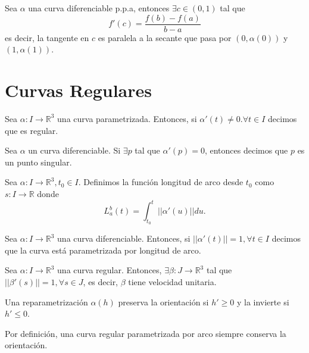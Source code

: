 \begin{theo}
  Sea $\alpha$ una curva diferenciable p.p.a, entonces $\exists c \in ( 0,1 )$ tal que 
  \[ 
    f'(c) = \frac{f(b) - f(a)}{b - a} 
  \] 
  es decir, la tangente en $c$ es paralela a la secante que pasa por $(0, \alpha(0))$ y $(1, \alpha(1))$.
\end{theo}


\section{Curvas Regulares}

\begin{defn}
  Sea $\alpha: I \to \mathbb{R}^{3}$ una curva parametrizada. Entonces, si $\alpha'(t) \neq 0. \forall t \in I$ decimos que es regular.
\end{defn}

\begin{defn}
  Sea $\alpha$ un curva diferenciable. Si $\exists p$ tal que $\alpha'(p) = 0$, entonces decimos que $p$ es un punto singular.
\end{defn}

\begin{defn}
  Sea $\alpha : I \to \mathbb{R}^{3}, t_{0} \in I$. Definimos la función longitud de arco desde $t_{0}$ como $s: I \to \mathbb{R}$ donde
  \[ 
    L^b_{a}(t) = \int_{t_{0}}^{t}  ||\alpha ' (u)|| du. 
  \] 
\end{defn}

\begin{defn}
  Sea $\alpha: I \to \mathbb{R}^{3}$ una curva diferenciable. Entonces, si $||\alpha'(t)|| = 1, \forall t \in I$ decimos que la curva está parametrizada por longitud de arco.
\end{defn}

\begin{theo}
  Sea $\alpha: I \to \mathbb{R}^{3}$ una curva regular. Entonces, $\exists \beta: J \to \mathbb{R}^{3}$ tal que $||\beta'(s)||=1, \forall s \in J$, es decir, $\beta$ tiene velocidad unitaria.
\end{theo}

\begin{obs}
  Una reparametrización $\alpha(h)$ preserva la orientación si $h' \geq 0$ y la invierte si $h' \leq 0$.
\end{obs}

\begin{obs}
  Por definición, una curva regular parametrizada por arco siempre conserva la orientación.
\end{obs}

